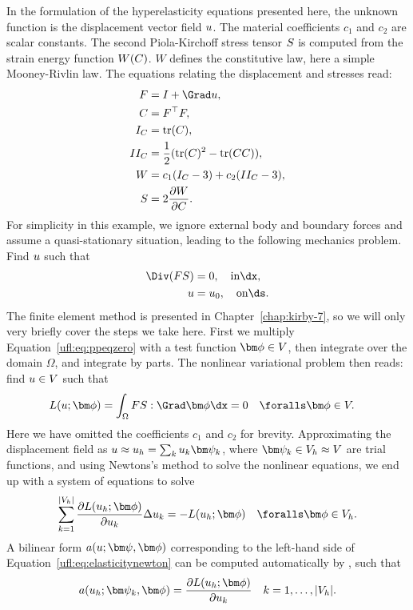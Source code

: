 In the formulation of the hyperelasticity equations presented
here, the unknown function is the displacement vector field ${u}$.
The material coefficients $c_1$ and $c_2$ are scalar constants.
The second Piola-Kirchoff stress tensor ${S}$ is computed from the
strain energy function $W({C})$. $W$ defines the constitutive law, here
a simple Mooney-Rivlin law. The equations relating the displacement and
stresses read:
\begin{align}
\begin{split}
\FF   &=  \II + \Grad \uu, \\
\CC   &=  \FF^{\top}\FF, \\
I_C   &=  \mop{tr}(\CC), \\
II_C  &=  \frac 1 2 (\mop{tr}(\CC)^2 - \mop{tr}(\CC\CC)), \\
W     &=  c_1(I_C - 3) + c_2(II_C - 3), \\
\SS   &=  2\frac{\partial W}{\partial\CC}.  \label{ufl:eq:hypdef}
\end{split}
\end{align}
For simplicity in this example, we ignore external body and boundary
forces and assume a quasi-stationary situation, leading to the following
mechanics problem. Find ${u}$ such that
\begin{align}
\Div (\FF\SS) &= 0, \quad \mbox{in} \dx, \label{ufl:eq:ppeqzero} \\
\uu &= \uu_0,       \quad \mbox{on} \ds.
\end{align}
The finite element method is presented in Chapter~\ref{chap:kirby-7},
so we will only very briefly cover the steps we take here.  First we
multiply Equation~\eqref{ufl:eq:ppeqzero} with a test function $\bphi
\in V$, then integrate over the domain $\Omega$, and integrate by parts.
The nonlinear variational problem then reads: find ${u} \in V$ such that
\begin{align}
L(\uu; \bphi) &= \int_\Omega \FF\SS : \Grad\bphi \dx = 0
  \quad \foralls \bphi \in V. \label{ufl:eq:hypdefL}
\end{align}
Here we have omitted the coefficients $c_1$ and $c_2$ for brevity.
Approximating the displacement field as $\uu \approx \uu_h = \sum_k
u_k \bpsi_k$, where $\bpsi_k \in V_h \approx V$ are trial functions,
and using Newtons's method to solve the nonlinear equations, we end up
with a system of equations to solve
\begin{align}
\sum_{k=1}^{|V_h|} \frac{\partial L(\uu_h; \bphi)}{\partial u_k} \Delta u_k =
  -L(\uu_h; \bphi)
  \quad \foralls \bphi \in V_h. \label{ufl:eq:elasticitynewton}
\end{align}
A bilinear form $a(\uu; \bpsi, \bphi)$ corresponding to the left-hand side
of Equation~\eqref{ufl:eq:elasticitynewton} can be computed automatically
by \ufl{}, such that
\begin{align}
a(\uu_h; \bpsi_k, \bphi) = \frac{\partial L(\uu_h; \bphi)}{\partial u_k}
  \quad k = 1, \ldots, |V_h|. \label{alnes-1:eq:hypdefa}
\end{align}

